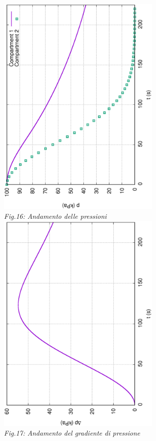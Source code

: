 \documentclass{article}
\begin{document}
        \begin{center}
            \includegraphics[width=0.6\textwidth, angle=-90]{MUL2/p_ES2_7.eps}\\
            \label{fig:press_10_7} 
            \textit{Fig.16: Andamento delle pressioni} \\ 
            \includegraphics[width=0.6\textwidth, angle=-90]{MUL2/Dp_ES2_7.eps}\\
            \label{fig:grad_press_10_7}
            \textit{Fig.17: Andamento del gradiente di pressione}\\
        \end{center}
        \pagebreak
\end{document}
